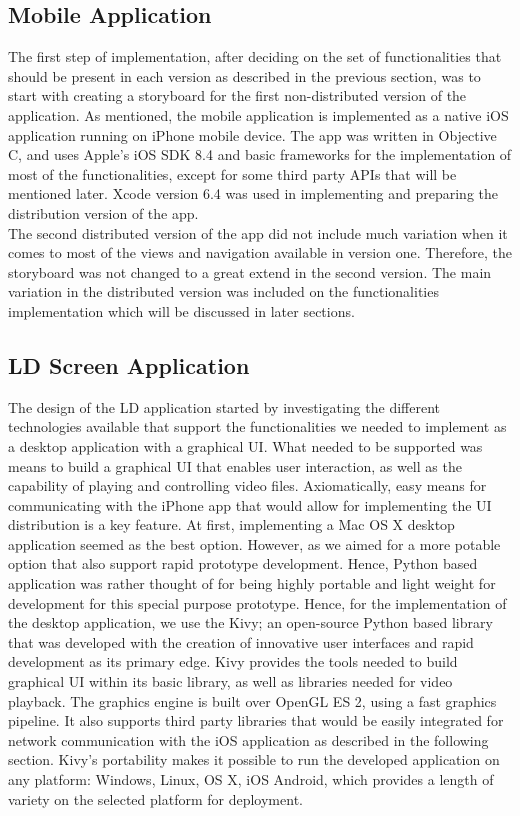 \subsection{Mobile Application}
The first step of implementation, after deciding on the set of functionalities that should be present in each version as described in the previous section, was to start with creating a storyboard for the first non-distributed version of the application. As mentioned, the mobile application is implemented as a native iOS application running on iPhone mobile device. The app was written in Objective C, and uses Apple's iOS SDK 8.4 and basic frameworks for the implementation of most of the functionalities, except for some third party APIs that will be mentioned later. Xcode version 6.4 was used in implementing and preparing the distribution version of the app.\\
The second distributed version of the app did not include much variation when it comes to most of the views and navigation available in version one. Therefore, the storyboard was not changed to a great extend in the second version. The main variation in the distributed version was included on the functionalities implementation which will be discussed in later sections.
  
\subsection{LD Screen Application}
The design of the LD application started by investigating the different technologies available that support the functionalities we needed to implement as a desktop application with a graphical UI. What needed to be supported was means to build a graphical UI that enables user interaction, as well as the capability of playing and controlling video files. Axiomatically, easy means for communicating with the iPhone app that would allow for implementing the UI distribution is a key feature. At first, implementing a Mac OS X desktop application seemed as the best option. However, as we aimed for a more potable option that also support rapid prototype development. Hence, Python based application was rather thought of for being highly portable and light weight for development for this special purpose prototype. Hence, for the implementation of the desktop application, we use the Kivy; an open-source Python based library that was developed with the creation of innovative user interfaces and rapid development as its primary edge. Kivy provides the tools needed to build graphical UI within its basic library, as well as libraries needed for video playback. The graphics engine is built over OpenGL ES 2, using a fast graphics pipeline. It also supports third party libraries that would be easily integrated for network communication with the iOS application as described in the following section. Kivy's portability makes it possible to run the developed application on any platform: Windows, Linux, OS X, iOS Android, which provides a length of variety on the selected platform for deployment.   
 
